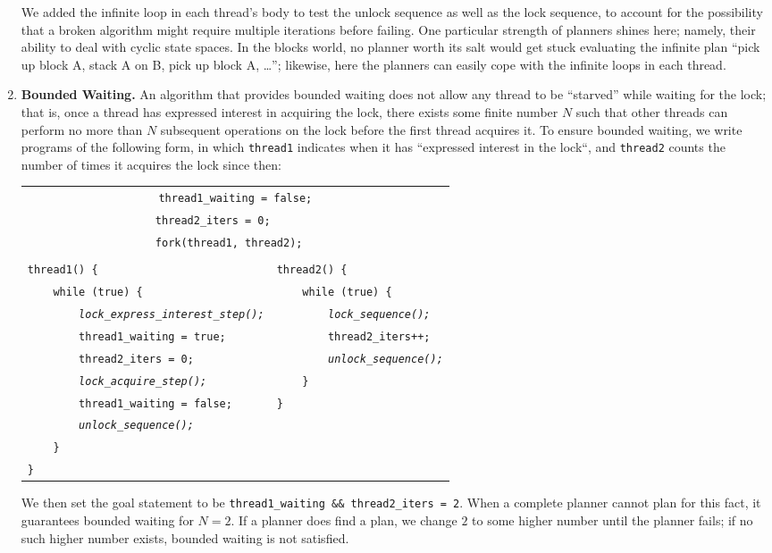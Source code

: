 \begin{enumerate}
	We added the infinite loop in each thread's body to test the unlock sequence as well as the lock sequence, to account for the possibility that a broken algorithm might require multiple iterations before failing. One particular strength of planners shines here; namely, their ability to deal with cyclic state spaces. In the blocks world, no planner worth its salt would get stuck evaluating the infinite plan ``pick up block A, stack A on B, pick up block A, \dots''; likewise, here the planners can easily cope with the infinite loops in each thread.
	\item {\bf Bounded Waiting.} An algorithm that provides bounded waiting does not allow any thread to be ``starved'' while waiting for the lock; that is, once a thread has expressed interest in acquiring the lock, there exists some finite number $N$ such that other threads can perform no more than $N$ subsequent operations on the lock before the first thread acquires it.
		To ensure bounded waiting, we write programs of the following form, in which \texttt{thread1} indicates when it has ``expressed interest in the lock``, and \texttt{thread2} counts the number of times it acquires the lock since then:
	\begin{center}
	\begin{tabular}{ll}
	\multicolumn{2}{c}{\texttt{thread1\_waiting = false;}} \\
	\multicolumn{2}{c}{\texttt{thread2\_iters = 0;~~~~~~~}} \\
	\multicolumn{2}{c}{\texttt{fork(thread1, thread2);~~}} \\
	& \\
	\texttt{thread1() \{} & \texttt{thread2() \{} \\
	\texttt{~~~~while (true) \{} & \texttt{~~~~while (true) \{} \\
	\texttt{~~~~~~~~\em lock\_express\_interest\_step();\qquad} & \texttt{~~~~~~~~\em lock\_sequence();} \\
	\texttt{~~~~~~~~thread1\_waiting = true;} & \texttt{~~~~~~~~thread2\_iters++;} \\
	\texttt{~~~~~~~~thread2\_iters = 0;} & \texttt{~~~~~~~~\em unlock\_sequence();} \\
     \texttt{~~~~~~~~\em lock\_acquire\_step();} & \texttt{~~~~\}} \\
	 \texttt{~~~~~~~~thread1\_waiting = false;} & \texttt{\}} \\
	\texttt{~~~~~~~~\em unlock\_sequence();} & \\
	\texttt{~~~~\}} & \\
	\texttt{\}} & \\
	\end{tabular}
	\end{center}
		We then set the goal statement to be \texttt{thread1\_waiting \&\& thread2\_iters = 2}. When a complete planner cannot plan for this fact, it guarantees bounded waiting for $N=2$. If a planner does find a plan, we change $2$ to some higher number until the planner fails; if no such higher number exists, bounded waiting is not satisfied.


\end{enumerate}
